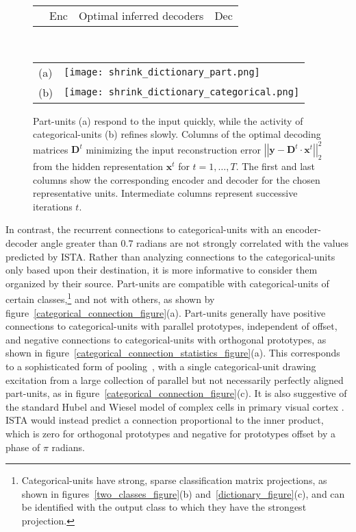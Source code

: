 \documentclass{article} %
\newcommand{\x}{\mathbf{x}}
\newcommand{\y}{\mathbf{y}}
\newcommand{\D}{\mathbf{D}}
\begin{document}
\begin{figure}[tb] %
  \begin{center}
    \begin{tabular}{p{0.12in}p{0.35in}p{4.05in}p{1in}} & Enc & Optimal inferred decoders & Dec \end{tabular} \\
    \begin{tabular}{p{0.03in}p{5.0in}}
      \parbox[b]{0in}{(a) \vspace{2.1cm}} & \texttt{[image: shrink\_dictionary\_part.png]} \\
      \parbox[b]{0in}{(b) \vspace{2.1cm}} & \texttt{[image: shrink\_dictionary\_categorical.png]} 
    \end{tabular}
  \end{center}
  \caption{Part-units (a) respond to the input quickly, while the activity of categorical-units (b) refines slowly.  Columns of the optimal decoding matrices $\D^t$ minimizing the input reconstruction error $\left|\left| \y - \D^t \cdot \x^t \right|\right|_2^2$ from the hidden representation $\x^t$ for $t = 1, \ldots, T$.  The first and last columns show the corresponding encoder and decoder for the chosen representative units.  Intermediate columns represent successive iterations $t$.  \label{dictionary_evolution_figure}} %
\end{figure}

In contrast, the recurrent connections to categorical-units with an encoder-decoder angle greater than $0.7$ radians are not strongly correlated with the values predicted by ISTA.  
Rather than analyzing connections to the categorical-units only based upon their destination, it is more informative to consider them organized by their source.
Part-units are compatible with categorical-units of certain classes,\footnote{Categorical-units have strong, sparse classification matrix projections, as shown in figures~\ref{two_classes_figure}(b) and~\ref{dictionary_figure}(c), and can be identified with the output class to which they have the strongest projection.} and not with others, as shown by figure~\ref{categorical_connection_figure}(a).  
Part-units generally have positive connections to categorical-units with parallel prototypes, independent of offset, and negative connections to categorical-units with orthogonal prototypes, as shown in figure~\ref{categorical_connection_statistics_figure}(a).  This corresponds to a sophisticated form of pooling~\citep{jarrett2009},  with a single categorical-unit drawing excitation from a large collection of parallel but not necessarily perfectly aligned part-units, as in figure~\ref{categorical_connection_figure}(c).  It is also suggestive of the standard Hubel and Wiesel model of complex cells in primary visual cortex \citep{hubel1962}.  ISTA would instead predict a connection proportional to the inner product, which is zero for orthogonal prototypes and negative for prototypes offset by a phase of $\pi$ radians.  
\end{document}
